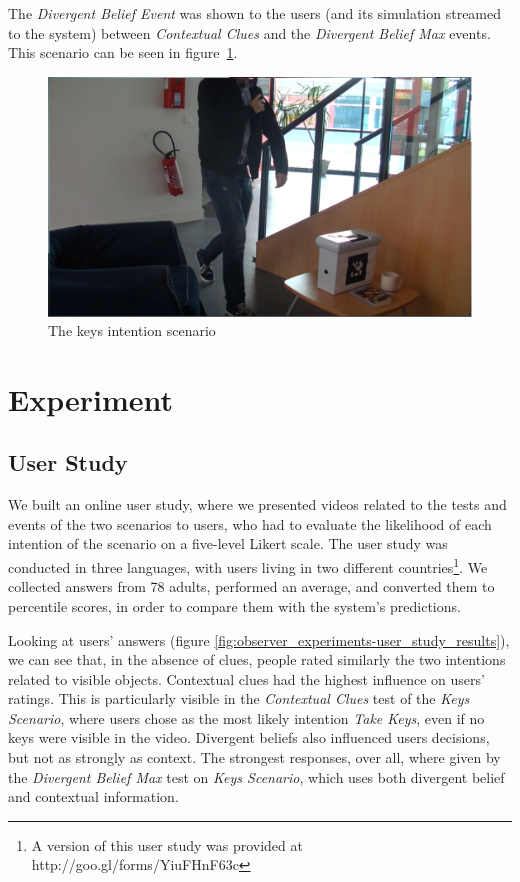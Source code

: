 The \textit{Divergent Belief Event} was shown to the users (and its simulation streamed to the system) between \textit{Contextual Clues} and the \textit{Divergent Belief Max} events. This scenario can be seen in figure~\ref{fig:observer_experiments-keys}.

 \begin{figure}[ht!]
	\centering
	\includegraphics[scale=0.5]{img/observer/keys2-blur.pdf}
	\caption{The keys intention scenario}
	\label{fig:observer_experiments-keys}
\end{figure}

\section{Experiment}
\label{sec:observer_experiment-experiment}
\subsection{User Study}
We built an online user study, where we presented videos related to the tests and events of the two scenarios to users, who had to evaluate the likelihood of each intention of the scenario
on a five-level Likert scale. The user study was conducted in three languages, with users living in two different countries\footnote{A version of this user study was provided at http://goo.gl/forms/YiuFHnF63c}. We collected answers from 78 adults, performed an average, and converted them to percentile scores, in order to compare them with the system's predictions.

Looking at users' answers (figure \ref{fig:observer_experiments-user_study_results}), we can see that, in the absence of clues, people rated similarly the two intentions related to visible objects. Contextual clues had the highest influence on users' ratings. This is particularly visible in the \textit{Contextual Clues} test of the \textit{Keys Scenario}, where users chose as the most likely intention \textit{Take Keys}, even if no keys were visible in the video. Divergent beliefs also influenced users decisions, but not as strongly as context. The strongest responses, over all, where given by the \textit{Divergent Belief Max} test on \textit{Keys Scenario}, which uses both divergent belief and contextual information.


